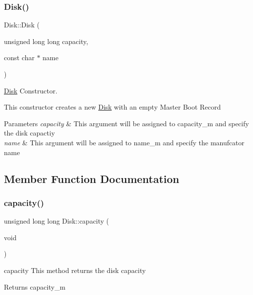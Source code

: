 \subsubsection{\texorpdfstring{Disk()}{Disk()}\hspace{0.1cm}{\footnotesize\ttfamily [4/4]}}
{\footnotesize\ttfamily Disk\+::\+Disk (\begin{DoxyParamCaption}\item[{unsigned long long}]{capacity,  }\item[{const char $\ast$}]{name }\end{DoxyParamCaption})}



\mbox{\hyperlink{classdisk_1_1_disk}{Disk}} Constructor. 

This constructor creates a new \mbox{\hyperlink{classdisk_1_1_disk}{Disk}} with an empty Master Boot Record 
\begin{DoxyParams}{Parameters}
{\em capacity} & This argument will be assigned to capacity\+\_\+m and specify the disk capactiy \\
\hline
{\em name} & This argument will be assigned to name\+\_\+m and specify the manufcator name \\
\hline
\end{DoxyParams}


\subsection{Member Function Documentation}
\mbox{\label{classdisk_1_1_disk_a4f0d7b0ab94fb0ed0a58bb19ce85729f}} 
\subsubsection{\texorpdfstring{capacity()}{capacity()}}
{\footnotesize\ttfamily unsigned long long Disk\+::capacity (\begin{DoxyParamCaption}\item[{void}]{ }\end{DoxyParamCaption})}



capacity This method returns the disk capacity 

\begin{DoxyReturn}{Returns}
capacity\+\_\+m 
\end{DoxyReturn}
\mbox{\label{classdisk_1_1_disk_ac3ed02b2b44d2d15039d3616238c0985}} 
